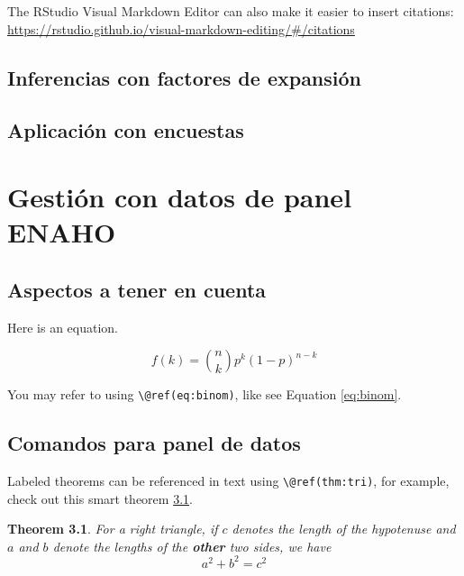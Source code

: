 \documentclass[
]{book}
\newtheorem{theorem}{Theorem}[chapter]
\theoremstyle{definition}
\theoremstyle{definition}
\theoremstyle{definition}
\theoremstyle{definition}
\theoremstyle{remark}
\begin{document}
The RStudio Visual Markdown Editor can also make it easier to insert citations: \url{https://rstudio.github.io/visual-markdown-editing/\#/citations}

\hypertarget{inferencias-con-factores-de-expansiuxf3n}{%
\section{Inferencias con factores de expansión}\label{inferencias-con-factores-de-expansiuxf3n}}

\hypertarget{aplicaciuxf3n-con-encuestas}{%
\section{Aplicación con encuestas}\label{aplicaciuxf3n-con-encuestas}}

\hypertarget{gestiuxf3n-con-datos-de-panel-enaho}{%
\chapter{Gestión con datos de panel ENAHO}\label{gestiuxf3n-con-datos-de-panel-enaho}}

\hypertarget{aspectos-a-tener-en-cuenta}{%
\section{Aspectos a tener en cuenta}\label{aspectos-a-tener-en-cuenta}}

Here is an equation.

\begin{equation} 
  f\left(k\right) = \binom{n}{k} p^k\left(1-p\right)^{n-k}
  \label{eq:binom}
\end{equation}

You may refer to using \texttt{\textbackslash{}@ref(eq:binom)}, like see Equation \eqref{eq:binom}.

\hypertarget{comandos-para-panel-de-datos}{%
\section{Comandos para panel de datos}\label{comandos-para-panel-de-datos}}

Labeled theorems can be referenced in text using \texttt{\textbackslash{}@ref(thm:tri)}, for example, check out this smart theorem \ref{thm:tri}.

\begin{theorem}
\protect\hypertarget{thm:tri}{}\label{thm:tri}For a right triangle, if \(c\) denotes the \emph{length} of the hypotenuse
and \(a\) and \(b\) denote the lengths of the \textbf{other} two sides, we have
\[a^2 + b^2 = c^2\]
\end{theorem}
\end{document}
